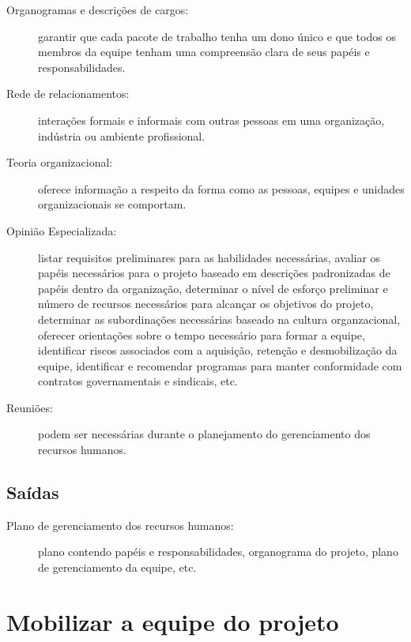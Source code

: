 \begin{description}

	\item[Organogramas e descrições de cargos:] garantir que cada pacote de trabalho tenha um dono único e que todos os membros da equipe tenham uma compreensão clara de seus papéis e responsabilidades.
	
	\item[Rede de relacionamentos:] interações formais e informais com outras pessoas em uma organização, indústria ou ambiente profissional.
	
	\item[Teoria organizacional:] oferece informação a respeito da forma como as pessoas, equipes e unidades organizacionais se comportam.
	
	\item[Opinião Especializada:] listar requisitos preliminares para as habilidades necessárias, avaliar os papéis necessários para o projeto baseado em descrições padronizadas de papéis dentro da organização, determinar o nível de esforço preliminar e número de recursos necessários para alcançar os objetivos do projeto, determinar as subordinações necessárias baseado na cultura organzacional, oferecer orientações sobre o tempo necessário para formar a equipe, identificar riscos associados com a aquisição, retenção e desmobilização da equipe, identificar e recomendar programas para manter conformidade com contratos governamentais e sindicais, etc.
	
	\item[Reuniões:] podem ser necessárias durante o planejamento do gerenciamento dos recursos humanos.
	

\end{description}

\section{Saídas}

\begin{description}
	
	\item[Plano de gerenciamento dos recursos humanos:] plano contendo papéis e responsabilidades, organograma do projeto, plano de gerenciamento da equipe, etc.	
	
\end{description}

\chapter{Mobilizar a equipe do projeto}


